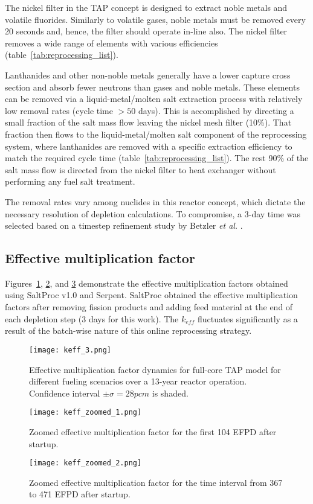 The nickel filter in the \gls{TAP} concept is designed to extract noble metals 
and volatile fluorides. Similarly to volatile gases, noble metals must be 
removed every 20 seconds and, hence, the filter should operate in-line also. 
The nickel filter removes a wide range of elements with various efficiencies 
(table~\ref{tab:reprocessing_list}).

Lanthanides and other non-noble metals generally have a lower capture  
cross section and absorb fewer neutrons than gases and noble metals. These 
elements can be removed via a liquid-metal/molten salt extraction process with 
relatively low removal rates (cycle time $> 50$ days). This is accomplished 
by directing a small fraction of the salt mass flow leaving the nickel mesh 
filter (10\%). That fraction then flows to the liquid-metal/molten salt 
component of the reprocessing system, where lanthanides are removed with a 
specific extraction efficiency to match the  required cycle time 
(table~\ref{tab:reprocessing_list}). The rest 90\% of the salt mass flow is 
directed from the nickel filter to heat exchanger without performing any fuel 
salt treatment.

The removal rates vary among nuclides in this reactor concept, which dictate 
the necessary resolution of depletion calculations. To compromise, a 3-day 
time was selected based on a timestep refinement study by Betzler \emph{et al.} 
\cite{betzler_assessment_2017}.
\subsection{Effective multiplication factor}
Figures~\ref{fig:keff}, \ref{fig:keff-zoomed}, and \ref{fig:keff-zoomed-2} 
demonstrate the effective multiplication factors obtained using SaltProc v1.0 
and Serpent. SaltProc obtained the effective multiplication factors after 
removing fission products and adding feed material at the end of each 
depletion step (3 days for this work). The $k_{eff}$ fluctuates significantly 
as a result of the batch-wise nature of this online reprocessing strategy.
\begin{figure}[htp!] %
	\texttt{[image: keff\_3.png]}
	\vspace{-0.2in}
	\caption{Effective multiplication factor dynamics for full-core
		\gls{TAP} model for different fueling scenarios over a 13-year reactor 
		operation. 
		Confidence interval $\pm\sigma=28pcm$ is shaded.}
	\label{fig:keff}
\end{figure}
\begin{figure}[htp!] %
	\centering
	\texttt{[image: keff\_zoomed\_1.png]}
	\caption{Zoomed effective multiplication factor for the first 104 EFPD 
		after startup.}
	\label{fig:keff-zoomed}
\end{figure}
\begin{figure}[htp!] %
	\centering
	\texttt{[image: keff\_zoomed\_2.png]}
	\caption{Zoomed effective multiplication factor for the time interval 
		from 367 to 471 EFPD after startup.}
	\label{fig:keff-zoomed-2}
\end{figure}

